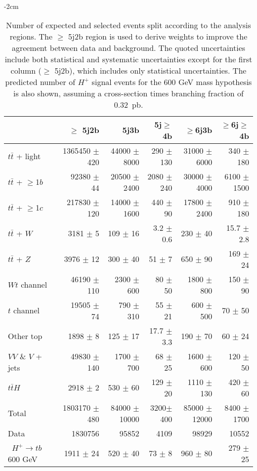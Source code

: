 \begin{table}[htb]
    \scriptsize
    \addtolength{\leftskip} {-2cm} %
    \addtolength{\rightskip}{-2cm}
    \centering
    \begin{tabular}{l r r r r r}
        \toprule\toprule
          & $\geq$ 5j2b & {5j3b} & {5j$\geq$4b} & {$\geq$6j3b} & {$\geq$6j$\geq$4b}\\
          \midrule 
  $t\bar{t}$ + light        & 1365450 $\pm$ 420 & 44000 $\pm$ 8000  & 290 $\pm$ 130  & 31000 $\pm$ 6000  & 340 $\pm$ 180 \\ 
  $t\bar{t}$ + $\geq$1$b$   & 92380   $\pm$ 44 & 20500  $\pm$ 2400  & 2080 $\pm$ 240 & 30000 $\pm$ 4000  & 6100 $\pm$ 1500   \\ 
  $t\bar{t}$ + $\geq$1$c$   & 217830  $\pm$ 120 & 14000 $\pm$ 1600  & 440 $\pm$ 90   & 17800 $\pm$ 2400  & 910  $\pm$ 180   \\ 
  $t\bar{t}$ + $W$          & 3181    $\pm$ 5   & 109   $\pm$ 16    & 3.2 $\pm$ 0.6  & 230   $\pm$ 40    & 15.7   $\pm$ 2.8 \\ 
  $t\bar{t}$ + $Z$          & 3976    $\pm$ 12  & 300   $\pm$ 40    & 51  $\pm$ 7    & 650   $\pm$ 90    & 169  $\pm$ 24 \\ 
  $Wt$ channel              & 46190   $\pm$ 110 & 2300  $\pm$ 600   & 80  $\pm$ 50   & 1800  $\pm$ 800   & 150  $\pm$ 90 \\ 
  $t$ channel               & 19505   $\pm$ 74  & 790   $\pm$ 310   & 55  $\pm$ 21   & 600   $\pm$ 500   & 70   $\pm$ 50 \\ 
  Other top         & 1898    $\pm$ 8   & 125   $\pm$ 17    & 17.7  $\pm$ 3.3    & 190   $\pm$ 70    & 60   $\pm$ 24 \\ 
  $VV$ \& $V$ + jets        & 49830   $\pm$ 140 & 1700  $\pm$ 700   & 68  $\pm$ 25   & 1600  $\pm$ 600   & 120  $\pm$ 50 \\ 
  $t\bar{t}H$               & 2918    $\pm$ 2   & 530   $\pm$ 60    & 129 $\pm$ 20   & 1110  $\pm$ 130   & 420  $\pm$ 60 \\ 
\midrule      
  Total                     &1803170 $\pm$ 480 & 84000 $\pm$ 10000 & 3200$\pm$ 400 & 85000 $\pm$ 12000 & 8400 $\pm$ 1700 \\
\midrule
  Data                      &1830756           & 95852             & 4109          & 98929          & 10552 \\
\midrule  
\midrule\ $H^+\to tb$ 600 GeV             & 1911 $\pm$ 24   & 520 $\pm$ 40      & 73 $\pm$ 8    & 960 $\pm$ 80   & 279 $\pm$ 25  \\   
\bottomrule\bottomrule                               
    \end{tabular}
    \caption{Number of expected and selected events split according to the analysis regions. The $\geq$ 5j2b region is used to derive weights to improve the agreement between data and background. The quoted uncertainties include both statistical and systematic uncertainties except for the first column ($\geq$ 5j2b), which includes only statistical uncertainties. The predicted number of $H^+$ signal events for the 600 GeV mass hypothesis is also shown, assuming a cross-section times branching fraction of 0.32~pb.}
    \label{Hplustb:prefityields}
\end{table}

